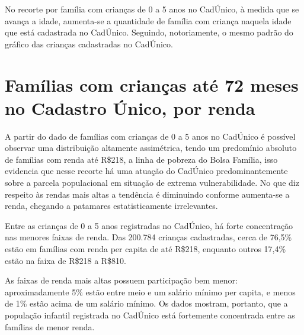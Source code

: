 
No recorte por família com crianças de 0 a 5 anos no CadÚnico, à medida que se avança a idade, aumenta-se a quantidade de família com criança naquela idade que está cadastrada no CadÚnico. Seguindo, notoriamente, o mesmo padrão do gráfico das crianças cadastradas no CadÚnico.


\section{Famílias com crianças até 72 meses no Cadastro Único, por renda}


A partir do dado de famílias com crianças de 0 a 5 anos no CadÚnico é possível observar uma distribuição altamente assimétrica, tendo um predomínio absoluto de famílias com renda até R\$218, a linha de pobreza do Bolsa Família, isso evidencia que nesse recorte há uma atuação do CadÚnico predominantemente sobre a parcela populacional em situação de extrema vulnerabilidade. No que diz respeito às rendas mais altas a tendência é diminuindo conforme aumenta-se a renda, chegando a patamares estatisticamente irrelevantes.


Entre as crianças de 0 a 5 anos registradas no CadÚnico, há forte concentração nas menores faixas de renda. Das 200.784 crianças cadastradas, cerca de 76,5\% estão em famílias com renda per capita de até R\$218, enquanto outros 17,4\% estão na faixa de R\$218 a R\$810.

As faixas de renda mais altas possuem participação bem menor: aproximadamente 5\% estão entre meio e um salário mínimo per capita, e menos de 1\% estão acima de um salário mínimo. Os dados mostram, portanto, que a população infantil registrada no CadÚnico está fortemente concentrada entre as famílias de menor renda.

